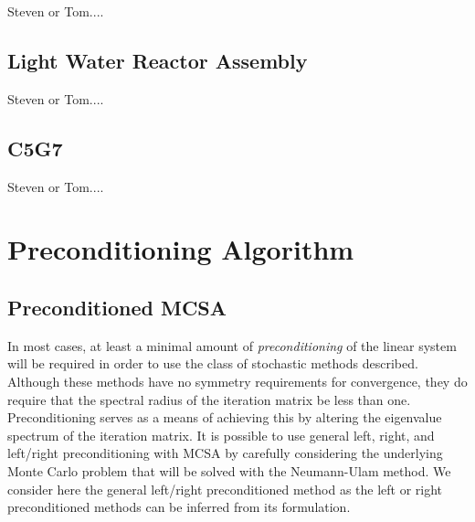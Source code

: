 \documentclass[letterpaper,11pt]{article}
\begin{document}
Steven or Tom....

\subsection{Light Water Reactor Assembly}

Steven or Tom....

\subsection{C5G7}

Steven or Tom....

\section{Preconditioning Algorithm}

\subsection{Preconditioned MCSA}
\label{subsec:preconditioning}
In most cases, at least a minimal amount of \textit{preconditioning}
of the linear system will be required in order to use the class of
stochastic methods described. Although these methods have no symmetry
requirements for convergence, they do require that the spectral radius
of the iteration matrix be less than one. Preconditioning serves as a
means of achieving this by altering the eigenvalue spectrum of the
iteration matrix. It is possible to use general left, right, and left/right
preconditioning with MCSA by carefully considering the underlying
Monte Carlo problem that will be solved with the Neumann-Ulam
method. We consider here the general left/right preconditioned method
as the left or right preconditioned methods can be inferred from its
formulation. 
\end{document}
